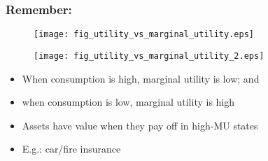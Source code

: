 \documentclass[presentation,dvipsnames]{beamer}
\begin{document}
\begin{frame}
\frametitle{Remember:}
\begin{figure}
\centering
\begin{minipage}{.5\textwidth}
  \centering
  \texttt{[image: fig\_utility\_vs\_marginal\_utility.eps]}
\end{minipage}%
\begin{minipage}{.5\textwidth}
  \centering
  \texttt{[image: fig\_utility\_vs\_marginal\_utility\_2.eps]}
\end{minipage}
\end{figure}
\begin{itemize}[label={--}]
\item When consumption is high, marginal utility is low; and
\item when consumption is low, marginal utility is high
\item Assets have value when they pay off in high-MU states
\item E.g.: car/fire insurance
\end{itemize}
\end{frame}



\end{document}
